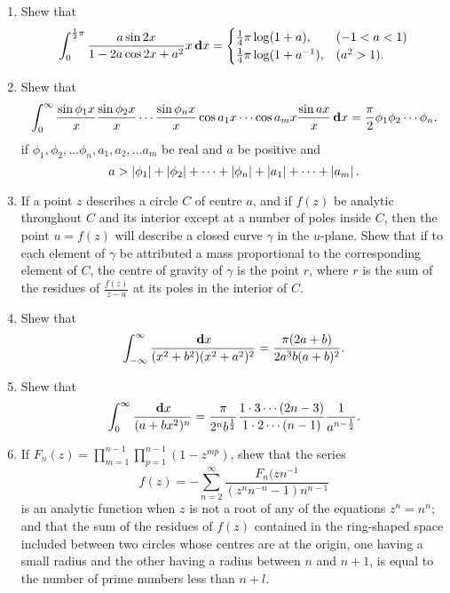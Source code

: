 \begin{enumerate}
\item
  Shew that
  $$
  \int_{0}^{\frac{1}{2}\pi}
  \frac{a \sin 2x}{1 - 2a \cos 2x + a^{2}}
  x \, \mathbf{d} x
  =
  \begin{cases}
    \frac{1}{4} \pi \log (1+a), & (-1<a<1)
    \\
    \frac{1}{4} \pi \log (1+a^{-1}), & (a^{2} > 1).
  \end{cases}
  $$
\item Shew that
  $$
  \int_{0}^{\infty}
  \frac{\sin \phi_{1}x}{x}
  \frac{\sin \phi_{2}x}{x}
  \cdots
  \frac{\sin \phi_{n}x}{x}
  \cos a_{1} x
  \cdots
  \cos a_{m} x
  \frac{ \sin ax }{x}
  \, \mathbf{d} x
  =
  \frac{\pi}{2} \phi_{1} \phi_{2} \cdots \phi_{n},
  $$
  if $\phi_{1}, \phi_{2}, \ldots \phi_{n}, a_{1}, a_{2}, \ldots a_{m}$
  be real and $a$ be positive and
  $$
  a
  >
  \left| \phi_{1} \right|
  + \left| \phi_{2} \right|
  + \cdots
  + \left| \phi_{n} \right|
  + \left| a_{1} \right|
  + \cdots
  + \left| a_{m} \right|.
  $$
\item
  If a point $z$ describes a circle $C$ of centre $a$, and if
  $f(z)$ be analytic throughout $C$ and its interior except at a
  number of poles inside $C$, then the point $u=f(z)$ will
  describe a closed curve $\gamma$ in the $u$-plane.
  Shew that if to each element of $\gamma$ be attributed
  a mass proportional to the corresponding element of $C$, the centre of
  gravity of $\gamma$ is the
  point $r$, where $r$ is the sum of the residues of
  $\frac{f(z)}{z-a}$ at its poles in the interior of $C$.
\item  Shew that
  $$
  \int_{-\infty}^{\infty}
  \frac{\, \mathbf{d} x}{ (x^{2}+b^{2}) (x^{2}+a^{2})^{2} }
  =
  \frac{\pi (2a+b)}{ 2a^{3}b(a+b)^{2}}.
  $$
\item
  Shew that
  $$
  \int_{0}^{\infty}
  \frac{\, \mathbf{d} x}{(a+bx^{2})^{n}}
  =
  \frac{\pi}{ 2^{n} b^{\frac{1}{2}} }
  \frac{1 \cdot 3 \cdots (2n-3)}{1 \cdot 2 \cdots (n-1)}
  \frac{1}{ a^{n-\frac{1}{2}} }.
  $$
%
%

\item
  If $F_{n}(z)= \prod_{m=1}^{n-1} \prod_{p=1}^{n-1} (1-z^{mp})$, shew that the series
  $$
  f(z)
  =
  - \sum_{n=2}^{\infty}
  \frac{F_{n}(zn^{-1}}{ (z^{n}n^{-n} -1) n^{n-1} }
  $$
  is an analytic function when $z$ is not a root of any of the equations
  $z^{n} = n^{n}$; and that the sum of the residues of $f(z)$ contained in the
  ring-shaped space included between two circles whose centres are at
  the origin, one having a small radius and the other having a radius
  between $n$ and $n + 1$, is equal to the number of prime numbers less than
  $n + l$. 


\end{enumerate}

